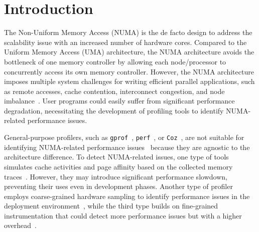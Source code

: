 \section{Introduction}
\label{sec:intro}



The Non-Uniform Memory Access (NUMA) is the de facto design to address the scalability issue with an increased number of hardware cores. Compared to the Uniform Memory Access (UMA) architecture, the NUMA architecture avoids the bottleneck of one memory controller by allowing each node/processor to concurrently access its own memory controller. However, the NUMA architecture imposes multiple system challenges for writing efficient parallel applications, such as remote accesses, cache contention, interconnect congestion, and node imbalance~\cite{Blagodurov:2011:CNC:2002181.2002182}. User programs could easily suffer from significant performance degradation, necessitating the development of profiling tools to identify NUMA-related performance issues. 

General-purpose profilers, such as \texttt{gprof}~\cite{DBLP:conf/sigplan/GrahamKM82}, \texttt{perf}~\cite{perf}, or \texttt{Coz}~\cite{Coz}, are not suitable for identifying NUMA-related performance issues~\cite{XuNuma,valat:2018:numaprof} because they are agnostic to the architecture difference. 
To detect NUMA-related issues, one type of tools
simulates cache activities and page affinity based on the collected memory traces~\cite{NUMAGrind, MACPO}. However, they may introduce significant performance slowdown, preventing their uses even in development phases. Another type of profiler employs coarse-grained hardware sampling to identify performance issues in the deployment environment~\cite{Intel:VTune, Memphis, Lachaize:2012:MMP:2342821.2342826, XuNuma, NumaMMA, 7847070}, while the third type builds on fine-grained instrumentation that could detect more performance issues but with a higher overhead~\cite{diener2015characterizing, valat:2018:numaprof}. 

